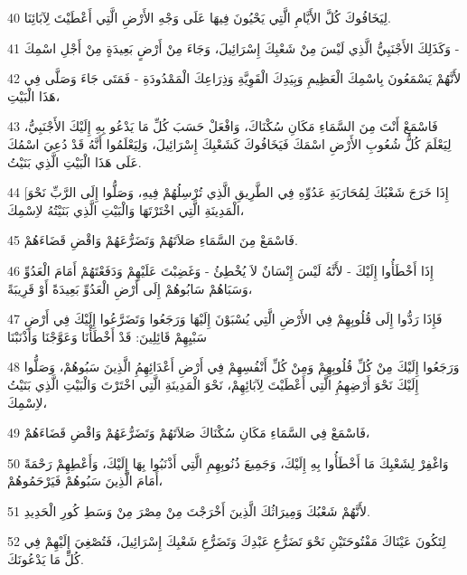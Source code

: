 \par 40 لِيَخَافُوكَ كُلَّ الأَيَّامِ الَّتِي يَحْيُونَ فِيهَا عَلَى وَجْهِ الأَرْضِ الَّتِي أَعْطَيْتَ لِآبَائِنَا.
\par 41 وَكَذَلِكَ الأَجْنَبِيُّ الَّذِي لَيْسَ مِنْ شَعْبِكَ إِسْرَائِيلَ، وَجَاءَ مِنْ أَرْضٍ بَعِيدَةٍ مِنْ أَجْلِ اسْمِكَ -
\par 42 لأَنَّهُمْ يَسْمَعُونَ بِاسْمِكَ الْعَظِيمِ وَبِيَدِكَ الْقَوِيَّةِ وَذِرَاعِكَ الْمَمْدُودَةِ - فَمَتَى جَاءَ وَصَلَّى فِي هَذَا الْبَيْتِ،
\par 43 فَاسْمَعْ أَنْتَ مِنَ السَّمَاءِ مَكَانِ سُكْنَاكَ، وَافْعَلْ حَسَبَ كُلِّ مَا يَدْعُو بِهِ إِلَيْكَ الأَجْنَبِيُّ، لِيَعْلَمَ كُلُّ شُعُوبِ الأَرْضِ اسْمَكَ فَيَخَافُوكَ كَشَعْبِكَ إِسْرَائِيلَ، وَلِيَعْلَمُوا أَنَّهُ قَدْ دُعِيَ اسْمُكَ عَلَى هَذَا الْبَيْتِ الَّذِي بَنَيْتُ.
\par 44 [إِذَا خَرَجَ شَعْبُكَ لِمُحَارَبَةِ عَدُوِّهِ فِي الطَّرِيقِ الَّذِي تُرْسِلُهُمْ فِيهِ، وَصَلُّوا إِلَى الرَّبِّ نَحْوَ الْمَدِينَةِ الَّتِي اخْتَرْتَهَا وَالْبَيْتِ الَّذِي بَنَيْتُهُ لاِسْمِكَ،
\par 45 فَاسْمَعْ مِنَ السَّمَاءِ صَلاَتَهُمْ وَتَضَرُّعَهُمْ وَاقْضِ قَضَاءَهُمْ.
\par 46 إِذَا أَخْطَأُوا إِلَيْكَ - لأَنَّهُ لَيْسَ إِنْسَانٌ لاَ يُخْطِئُ - وَغَضِبْتَ عَلَيْهِمْ وَدَفَعْتَهُمْ أَمَامَ الْعَدُوِّ وَسَبَاهُمْ سَابُوهُمْ إِلَى أَرْضِ الْعَدُوِّ بَعِيدَةً أَوْ قَرِيبَةً،
\par 47 فَإِذَا رَدُّوا إِلَى قُلُوبِهِمْ فِي الأَرْضِ الَّتِي يُسْبَوْنَ إِلَيْهَا وَرَجَعُوا وَتَضَرَّعُوا إِلَيْكَ فِي أَرْضِ سَبْيِهِمْ قَائِلِينَ: قَدْ أَخْطَأْنَا وَعَوَّجْنَا وَأَذْنَبْنَا
\par 48 وَرَجَعُوا إِلَيْكَ مِنْ كُلِّ قُلُوبِهِمْ وَمِنْ كُلِّ أَنْفُسِهِمْ فِي أَرْضِ أَعْدَائِهِمُِ الَّذِينَ سَبُوهُمْ، وَصَلُّوا إِلَيْكَ نَحْوَ أَرْضِهِمُِ الَّتِي أَعْطَيْتَ لِآبَائِهِمْ، نَحْوَ الْمَدِينَةِ الَّتِي اخْتَرْتَ وَالْبَيْتِ الَّذِي بَنَيْتُ لاِسْمِكَ،
\par 49 فَاسْمَعْ فِي السَّمَاءِ مَكَانِ سُكْنَاكَ صَلاَتَهُمْ وَتَضَرُّعَهُمْ وَاقْضِ قَضَاءَهُمْ،
\par 50 وَاغْفِرْ لِشَعْبِكَ مَا أَخْطَأُوا بِهِ إِلَيْكَ، وَجَمِيعَ ذُنُوبِهِمِ الَّتِي أَذْنَبُوا بِهَا إِلَيْكَ، وَأَعْطِهِمْ رَحْمَةً أَمَامَ الَّذِينَ سَبُوهُمْ فَيَرْحَمُوهُمْ،
\par 51 لأَنَّهُمْ شَعْبُكَ وَمِيرَاثُكَ الَّذِينَ أَخْرَجْتَ مِنْ مِصْرَ مِنْ وَسَطِ كُورِ الْحَدِيدِ.
\par 52 لِتَكُونَ عَيْنَاكَ مَفْتُوحَتَيْنِ نَحْوَ تَضَرُّعِ عَبْدِكَ وَتَضَرُّعِ شَعْبِكَ إِسْرَائِيلَ، فَتُصْغِيَ إِلَيْهِمْ فِي كُلِّ مَا يَدْعُونَكَ.
